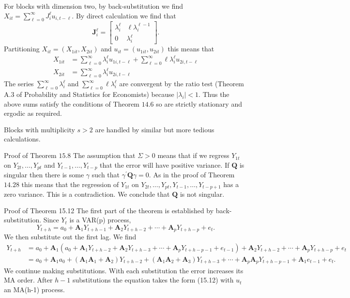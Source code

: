 \documentclass[10pt]{article}
\begin{document}
For blocks with dimension two, by back-substitution we find $X_{i t}=\sum_{\ell=0}^{\infty} J_{i}^{\ell} u_{i, t-\ell}$. By direct calculation we find that
$$
\boldsymbol{J}_{i}^{\ell}=\left[\begin{array}{cc}
\lambda_{i}^{\ell} & \ell \lambda_{i}^{\ell-1} \\
0 & \lambda_{i}^{\ell}
\end{array}\right] .
$$
Partitioning $X_{i t}=\left(X_{1 i t}, X_{2 i t}\right)$ and $u_{i t}=\left(u_{1 i t}, u_{2 i t}\right)$ this means that
$$
\begin{aligned}
X_{1 i t} &=\sum_{\ell=0}^{\infty} \lambda_{i}^{\ell} u_{1 i, t-\ell}+\sum_{\ell=0}^{\infty} \ell \lambda_{i}^{\ell} u_{2 i, t-\ell} \\
X_{2 i t} &=\sum_{\ell=0}^{\infty} \lambda_{i}^{\ell} u_{2 i, t-\ell}
\end{aligned}
$$
The series $\sum_{\ell=0}^{\infty} \lambda_{i}^{\ell}$ and $\sum_{\ell=0}^{\infty} \ell \lambda_{i}^{\ell}$ are convergent by the ratio test (Theorem A.3 of Probability and Statistics for Economists) because $\left|\lambda_{i}\right|<1$. Thus the above sums satisfy the conditions of Theorem $14.6$ so are strictly stationary and ergodic as required.

Blocks with multiplicity $s>2$ are handled by similar but more tedious calculations.

Proof of Theorem $15.8$ The assumption that $\Sigma>0$ means that if we regress $Y_{1 t}$ on $Y_{2 t}, \ldots, Y_{p t}$ and $Y_{t-1}, \ldots, Y_{t-p}$ that the error will have positive variance. If $\boldsymbol{Q}$ is singular then there is some $\gamma$ such that $\gamma^{\prime} \boldsymbol{Q} \gamma=0$. As in the proof of Theorem $14.28$ this means that the regression of $Y_{1 t}$ on $Y_{2 t}, \ldots, Y_{p t}, Y_{t-1}, \ldots, Y_{t-p+1}$ has a zero variance. This is a contradiction. We conclude that $\boldsymbol{Q}$ is not singular.

Proof of Theorem 15.12 The first part of the theorem is established by back-substitution. Since $Y_{t}$ is a VAR(p) process,
$$
Y_{t+h}=a_{0}+\boldsymbol{A}_{1} Y_{t+h-1}+\boldsymbol{A}_{2} Y_{t+h-2}+\cdots+\boldsymbol{A}_{p} Y_{t+h-p}+e_{t} .
$$
We then substitute out the first lag. We find
$$
\begin{aligned}
Y_{t+h} &=a_{0}+\boldsymbol{A}_{1}\left(a_{0}+\boldsymbol{A}_{1} Y_{t+h-2}+\boldsymbol{A}_{2} Y_{t+h-3}+\cdots+\boldsymbol{A}_{p} Y_{t+h-p-1}+e_{t-1}\right)+\boldsymbol{A}_{2} Y_{t+h-2}+\cdots+\boldsymbol{A}_{p} Y_{t+h-p}+e_{t} \\
&=a_{0}+\boldsymbol{A}_{1} a_{0}+\left(\boldsymbol{A}_{1} \boldsymbol{A}_{1}+\boldsymbol{A}_{2}\right) Y_{t+h-2}+\left(\boldsymbol{A}_{1} \boldsymbol{A}_{2}+\boldsymbol{A}_{3}\right) Y_{t+h-3}+\cdots+\boldsymbol{A}_{p} \boldsymbol{A}_{p} Y_{t+h-p-1}+\boldsymbol{A}_{1} e_{t-1}+e_{t} .
\end{aligned}
$$
We continue making substitutions. With each substitution the error increases its MA order. After $h-1$ substitutions the equation takes the form (15.12) with $u_{t}$ an MA(h-1) process.
\end{document}
